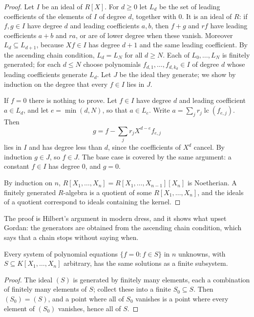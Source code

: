 \begin{proof}
Let $I$ be an ideal of $R[X]$. For $d\ge0$ let $L_d$ be the set of leading coefficients of the elements of $I$ of degree $d$, together with $0$. It is an ideal of $R$: if $f,g\in I$ have degree $d$ and leading coefficients
$a,b$, then $f+g$ and $rf$ have leading coefficients $a+b$ and $ra$, or are of lower degree when these vanish. Moreover $L_d\subseteq L_{d+1}$, because $Xf\in I$ has degree $d+1$ and the same leading coefficient. By the ascending
chain condition, $L_d=L_N$ for all $d\ge N$. Each of $L_0,\dots,L_N$ is finitely generated; for each $d\le N$ choose polynomials $f_{d,1},\dots,f_{d,k_d}\in I$ of degree $d$ whose leading coefficients generate $L_d$. Let $J$ be the ideal they
generate; we show by induction on the degree that every $f\in I$ lies in $J$.

If $f=0$ there is nothing to prove. Let $f\in I$ have degree $d$ and leading coefficient $a\in L_d$, and let $e=\min(d,N)$, so that $a\in L_e$. Write $a=\sum_jr_j\operatorname{lc}(f_{e,j})$. Then
\[g=f-\sum_jr_jX^{d-e}f_{e,j}\]
lies in $I$ and has degree less than $d$, since the coefficients of $X^d$ cancel. By induction $g\in J$, so $f\in J$. The base case is covered by the same argument: a constant $f\in I$ has degree $0$, and $g=0$.

By induction on $n$, $R[X_1,\dots,X_n]=R[X_1,\dots,X_{n-1}][X_n]$ is Noetherian. A finitely generated $R$-algebra is a quotient of some $R[X_1,\dots,X_n]$, and the ideals of a quotient correspond to ideals containing the kernel.
\end{proof}

The proof is Hilbert's argument in modern dress, and it shows what upset Gordan: the generators are obtained from the ascending chain condition, which says that a chain stops without saying when.

\begin{corollary}\label{cor:finitesystem}
Every system of polynomial equations $\{f=0:f\in S\}$ in $n$ unknowns, with $S\subseteq K[X_1,\dots,X_n]$ arbitrary, has the same solutions as a finite subsystem.
\end{corollary}

\begin{proof}
The ideal $(S)$ is generated by finitely many elements, each a combination of finitely many elements of $S$; collect these into a finite $S_0\subseteq S$. Then $(S_0)=(S)$, and a point where all of $S_0$ vanishes
is a point where every element of $(S_0)$ vanishes, hence all of $S$.
\end{proof}

